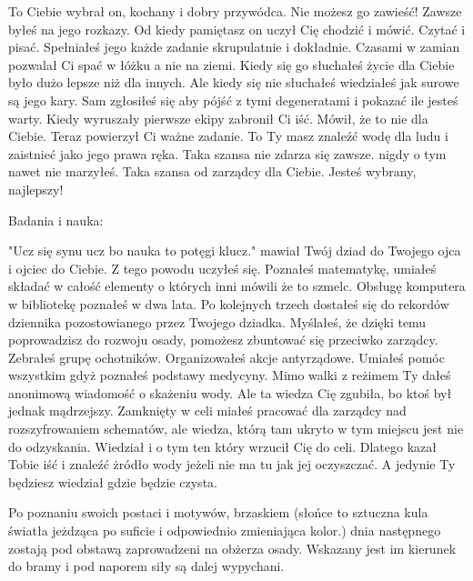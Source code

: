 \documentclass{article}
\begin{document}
    \begin{tcolorbox}
        \ttfamily
        To Ciebie wybrał on, kochany i dobry przywódca. Nie możesz go zawieść! Zawsze byłeś na jego rozkazy. Od kiedy pamiętasz on uczył Cię chodzić i mówić. Czytać i pisać. Spełniałeś jego każde zadanie skrupulatnie i dokładnie. Czasami w zamian pozwalał Ci spać w łóżku a nie na ziemi. Kiedy się go słuchałeś życie dla Ciebie było dużo lepsze niż dla innych. Ale kiedy się nie słuchałeś wiedziałeś jak surowe są jego kary. Sam zgłosiłeś się aby pójść z tymi degeneratami i pokazać ile jesteś warty. Kiedy wyruszały pierwsze ekipy zabronił Ci iść. Mówił, że to nie dla Ciebie. Teraz powierzył Ci ważne zadanie. To Ty masz znaleźć wodę dla ludu i zaistnieć jako jego prawa ręka. Taka szansa nie zdarza się zawsze. nigdy o tym nawet nie marzyłeś. Taka szansa od zarządcy dla Ciebie. Jesteś wybrany, najlepszy!
    \end{tcolorbox}

    Badania i nauka:

    \begin{tcolorbox}
        \ttfamily
        "Ucz się synu ucz bo nauka to potęgi klucz." mawiał Twój dziad do Twojego ojca i ojciec do Ciebie. Z tego powodu uczyłeś się. Poznałeś matematykę, umiałeś składać w całość elementy o których inni mówili że to szmelc. Obsługę komputera w bibliotekę poznałeś w dwa lata. Po kolejnych trzech dostałeś się do rekordów dziennika pozostowianego przez Twojego dziadka. Myślałeś, że dzięki temu poprowadzisz do rozwoju osady, pomożesz zbuntować się przeciwko zarządcy. Zebrałeś grupę ochotników. Organizowałeś akcje antyrządowe. Umiałeś pomóc wszystkim gdyż poznałeś podstawy medycyny. Mimo walki z reżimem Ty dałeś anonimową wiadomość o skażeniu wody. Ale ta wiedza Cię zgubiła, bo ktoś był jednak mądrzejszy. Zamknięty w celi miałeś pracować dla zarządcy nad rozszyfrowaniem schematów, ale wiedza, którą tam ukryto w tym miejscu jest nie do odzyskania. Wiedział i o tym ten który wrzucił Cię do celi. Dlatego kazał Tobie iść i znaleźć żródło wody jeżeli nie ma tu jak jej oczyszczać. A jedynie Ty będziesz wiedział gdzie będzie czysta.
    \end{tcolorbox}

    \bigskip

    Po poznaniu swoich postaci i motywów, brzaskiem (słońce to sztuczna kula światła jeżdząca po suficie i odpowiednio zmieniająca kolor.) dnia następnego zostają pod obstawą zaprowadzeni na obżerza osady. Wskazany jest im kierunek do bramy i pod naporem siły są dalej wypychani.
\end{document}
